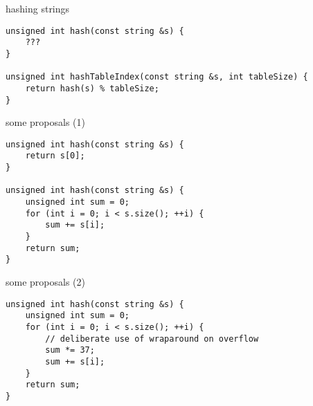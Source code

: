 \begin{frame}[fragile,label=hashStrIntro]{hashing strings}
\lstset{language=C++,style=small}
\begin{lstlisting}
unsigned int hash(const string &s) {
    ???
}

unsigned int hashTableIndex(const string &s, int tableSize) {
    return hash(s) % tableSize;
}
\end{lstlisting}
\end{frame}

\begin{frame}[fragile,label=hashStrProposals1]{some proposals (1)}
\lstset{language=C++,style=small}
\begin{lstlisting}
unsigned int hash(const string &s) {
    return s[0];
}

unsigned int hash(const string &s) {
    unsigned int sum = 0;
    for (int i = 0; i < s.size(); ++i) {
        sum += s[i];
    }
    return sum;
}
\end{lstlisting}
\end{frame}


\begin{frame}[fragile,label=hashStrProposals2]{some proposals (2)}
\lstset{language=C++,style=small}
\begin{lstlisting}
unsigned int hash(const string &s) {
    unsigned int sum = 0;
    for (int i = 0; i < s.size(); ++i) {
        // deliberate use of wraparound on overflow
        sum *= 37;
        sum += s[i];
    }
    return sum;
}
\end{lstlisting}
\end{frame}
